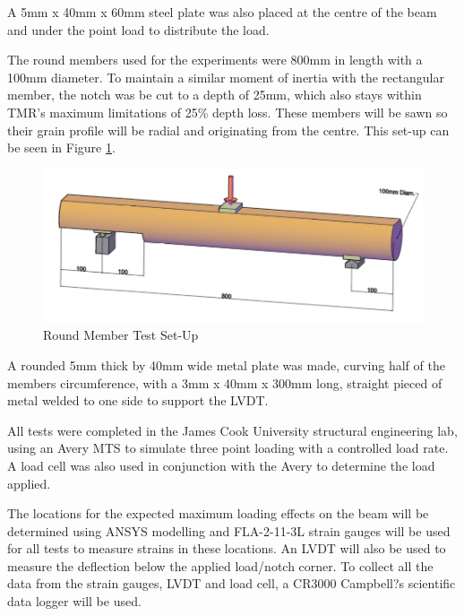 \documentclass[11pt,a4paper]{article}
\numberwithin{equation}{subsection}
\begin{document}
\pagebreak

\noindent
A 5mm x 40mm x 60mm steel plate was also placed at the centre of the beam and under the point load to distribute the load.

\vspace*{\baselineskip}

\noindent
The round members used for the experiments were 800mm in length with a 100mm diameter. To maintain a similar moment of inertia with the rectangular member, the notch was be cut to a depth of 25mm, which also stays within TMR's maximum limitations of 25\% depth loss. These members will be sawn so their grain profile will be radial and originating from the centre. This set-up can be seen in Figure \ref{fig:round}.


 \begin{figure}[h]
 	\begin{center}
 		\includegraphics[scale=0.35]{Circular_Setup}
 	\end{center}
 		\caption{Round Member Test Set-Up}
 		\label{fig:round}
 \end{figure}
\pagebreak

\noindent
A rounded 5mm thick by 40mm wide metal plate was made, curving half of the members circumference, with a 3mm x 40mm x 300mm long, straight pieced of metal welded to one side to support the LVDT. 

\vspace*{\baselineskip}

\noindent
All tests were completed in the James Cook University structural engineering lab, using an Avery MTS to simulate three point loading with a controlled load rate. A load cell was also used in conjunction with the Avery to determine the load applied. 

\vspace*{\baselineskip}

\noindent
 The locations for the expected maximum loading effects on the beam will be determined using ANSYS modelling and FLA-2-11-3L strain gauges will be used for all tests to measure strains in these locations. An LVDT will also be used to measure the deflection below the applied load/notch corner. To collect all the data from the strain gauges, LVDT and load cell, a CR3000 Campbell?s scientific data logger will be used.
\end{document}
